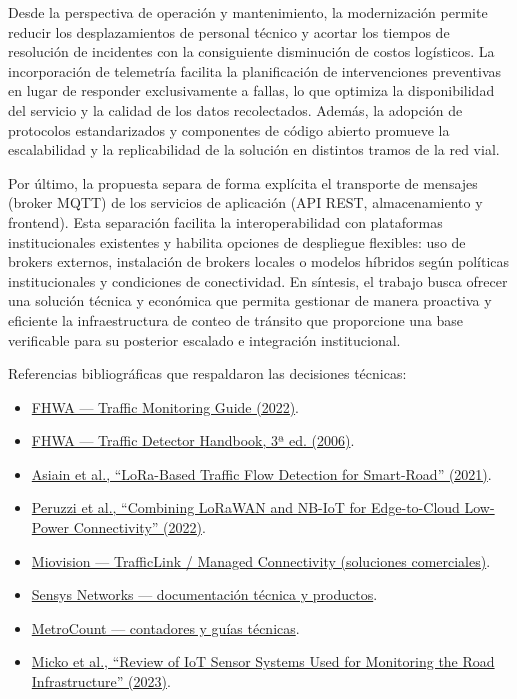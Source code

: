 Desde la perspectiva de operación y mantenimiento, la modernización permite reducir los desplazamientos de personal técnico y acortar los tiempos de resolución de incidentes con la consiguiente disminución de costos logísticos. La incorporación de telemetría facilita la planificación de intervenciones preventivas en lugar de responder exclusivamente a fallas, lo que optimiza la disponibilidad del servicio y la calidad de los datos recolectados. Además, la adopción de protocolos estandarizados y componentes de código abierto promueve la escalabilidad y la replicabilidad de la solución en distintos tramos de la red vial.

Por último, la propuesta separa de forma explícita el transporte de mensajes (broker MQTT) de los servicios de aplicación (API REST, almacenamiento y frontend). Esta separación facilita la interoperabilidad con plataformas institucionales existentes y habilita opciones de despliegue flexibles: uso de brokers externos, instalación de brokers locales o modelos híbridos según políticas institucionales y condiciones de conectividad. En síntesis, el trabajo busca ofrecer una solución técnica y económica que permita gestionar de manera proactiva y eficiente la infraestructura de conteo de tránsito que proporcione una base verificable para su posterior escalado e integración institucional.

Referencias bibliográficas que respaldaron las decisiones técnicas:
\begin{itemize}
  \item \href{https://www.fhwa.dot.gov/policyinformation/tmguide/2022_TMG_Final_Report.pdf}{FHWA — Traffic Monitoring Guide (2022)}.
  \item \href{https://www.fhwa.dot.gov/publications/research/operations/its/06108/06108.pdf}{FHWA — Traffic Detector Handbook, 3ª ed. (2006)}.
  \item \href{https://www.mdpi.com/1424-8220/21/2/338}{Asiain et al., ``LoRa-Based Traffic Flow Detection for Smart-Road'' (2021)}.
  \item \href{https://www.mdpi.com/2076-3417/12/3/1497}{Peruzzi et al., ``Combining LoRaWAN and NB-IoT for Edge-to-Cloud Low-Power Connectivity'' (2022)}.
  \item \href{https://miovision.com/trafficlink/}{Miovision — TrafficLink / Managed Connectivity (soluciones comerciales)}.
  \item \href{https://sensysnetworks.com/}{Sensys Networks — documentación técnica y productos}.
  \item \href{https://www.metrocount.com/}{MetroCount — contadores y guías técnicas}.
  \item \href{https://www.mdpi.com/1424-8220/23/9/4469}{Micko et al., ``Review of IoT Sensor Systems Used for Monitoring the Road Infrastructure'' (2023)}.
\end{itemize}




